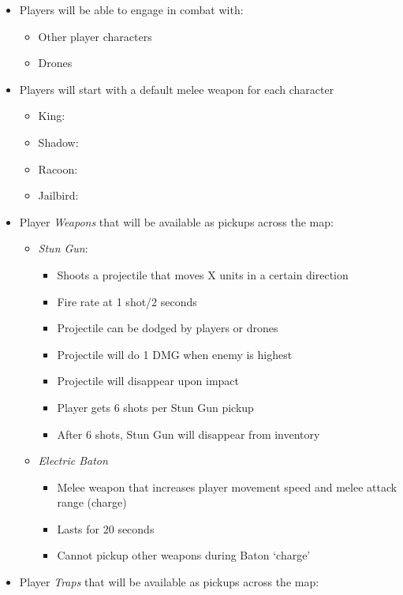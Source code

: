 \documentclass[14pt]{report}
\begin{document}
\begin{itemize}
    \item Players will be able to engage in combat with:
    \begin{itemize}
        \item Other player characters
        \item Drones
    \end{itemize}
    \item Players will start with a default melee weapon for each character
    \begin{itemize}
        \item King:
        \item Shadow:
        \item Racoon:
        \item Jailbird:
    \end{itemize}
    \item Player \emph{Weapons} that will be available as pickups across the map:
    \begin{itemize}
        \item \emph{Stun Gun}:
        \begin{itemize}
            \item Shoots a projectile that moves X units in a certain direction
            \item Fire rate at 1 shot/2 seconds
            \item Projectile can be dodged by players or drones
            \item Projectile will do 1 DMG when enemy is highest
            \item Projectile will disappear upon impact
            \item Player gets 6 shots per Stun Gun pickup
            \item After 6 shots, Stun Gun will disappear from inventory
        \end{itemize}
        \item \emph{Electric Baton}
        \begin{itemize}
            \item Melee weapon that increases player movement speed and melee attack range (charge)
            \item Lasts for 20 seconds
            \item Cannot pickup other weapons during Baton `charge'
        \end{itemize}
    \end{itemize}
    \item Player \emph{Traps} that will be available as pickups across the map:

\end{itemize}
\end{document}
